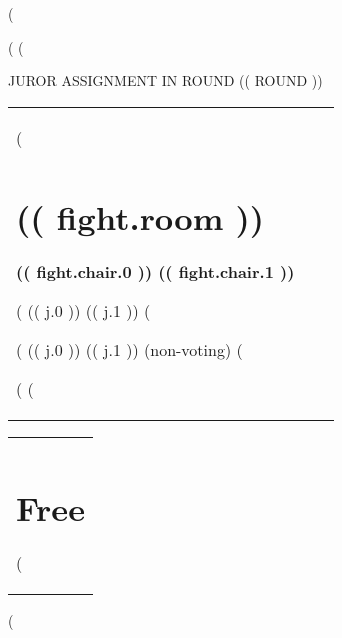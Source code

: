 (%
\usepackage{tabularx}
\parindent0pt
(%
(%

\begin{center}
\LARGE \uppercase{Juror Assignment in Round (( round ))}
\bigskip
\end{center}
\begin{tabularx}{\textwidth}{@{}X@{}X@{}X}
(%
    \begin{minipage}[t]{\linewidth}
    \section*{(( fight.room ))}
    \textbf{(( fight.chair.0 )) (( fight.chair.1 ))}

    (%
        (( j.0 )) ((  j.1 ))
    (%

    (%
        {\lightfont (( j.0 )) ((  j.1 )) (non-voting)}
    (%
    \end{minipage}\bigskip (%
(%
\end{tabularx}\bigskip

\begin{tabularx}{\textwidth}{@{}X}
    \begin{minipage}[t]{\linewidth}
    \section*{Free}

    (%

    \end{minipage}\bigskip
\end{tabularx}
(%